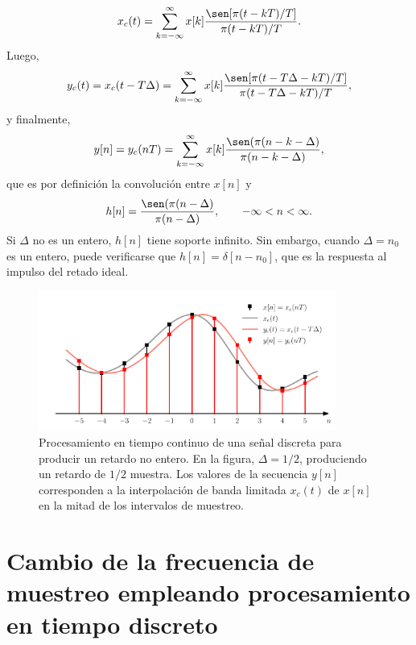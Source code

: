 \documentclass[a4paper]{report}
\begin{document}
\[
 x_c(t)=\sum_{k=-\infty}^\infty x[k]\frac{\sen[\pi(t-kT)/T]}{\pi(t-kT)/T}.
\]
Luego,
\[
 y_c(t)=x_c(t-T\Delta)=\sum_{k=-\infty}^\infty x[k]\frac{\sen[\pi(t-T\Delta-kT)/T]}{\pi(t-T\Delta-kT)/T},
\]
y finalmente,
\[
 y[n]=y_c(nT)=\sum_{k=-\infty}^\infty x[k]\frac{\sen(\pi(n-k-\Delta)}{\pi(n-k-\Delta)},
\]
que es por definición la convolución entre \(x[n]\) y 
\[
 h[n]=\frac{\sen(\pi(n-\Delta)}{\pi(n-\Delta)},
 \qquad-\infty<n<\infty.
\]
Si \(\Delta\) no es un entero, \(h[n]\) tiene soporte infinito. Sin embargo, cuando \(\Delta=n_0\) es un entero, puede verificarse que \(h[n]=\delta[n-n_0]\), que es la respuesta al impulso del retado ideal.
\begin{figure}[!htb]
 \begin{center}
 \includegraphics[width=0.87\textwidth]{figuras/sampling_example_04_07_non_integer_delay.pdf}
 \caption{\label{fig:sampling_example_04_07_non_integer_delay} Procesamiento en tiempo continuo de una señal discreta para producir un retardo no entero. En la figura, \(\Delta=1/2\), produciendo un retardo de \(1/2\) muestra. Los valores de la secuencia \(y[n]\) corresponden a la interpolación de banda limitada \(x_c(t)\) de \(x[n]\) en la mitad de los intervalos de muestreo.}
 \end{center}
\end{figure}

\section{Cambio de la frecuencia de muestreo empleando procesamiento en tiempo discreto}
\end{document}
